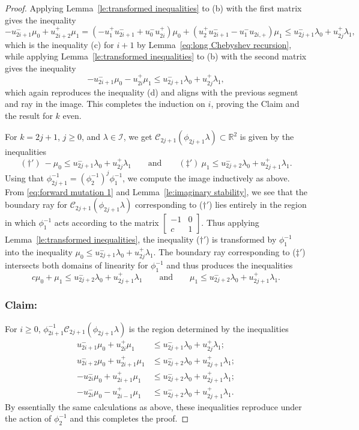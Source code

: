 \documentclass[pdflatex,sn-mathphys]{sn-jnl}%
\theoremstyle{thmstyleone}%
\theoremstyle{thmstyletwo}%
\theoremstyle{thmstylethree}%
\newcommand{\cC}{\mathcal{C}}
\newcommand{\cI}{\mathcal{I}}
\newcommand{\RR}{\mathbb{R}}
\begin{document}
\begin{proof}
    Applying Lemma~\ref{le:transformed inequalities} to (b) with the first matrix gives the inequality 
    \[-u_{2i+1}^-\mu_0+u_{2i+2}^+\mu_1=(-u_1^+u_{2i+1}^-+u_0^-u_{2i}^+)\mu_0+(u_2^+u_{2i+1}^--u_1^-u_{2i,+})\mu_1\le u_{2j+1}^-\lambda_0+u_{2j}^+\lambda_1,\]
    which is the inequality (c) for $i+1$ by Lemma~\ref{eq:long Chebyshev recursion}, while applying Lemma~\ref{le:transformed inequalities} to (b) with the second matrix gives the inequality 
    \[-u_{2i+1}^-\mu_0-u_{2i}^+\mu_1\le u_{2j+1}^-\lambda_0+u_{2j}^+\lambda_1,\]
    which again reproduces the inequality (d) and aligns with the previous segment and ray in the image.
    This completes the induction on $i$, proving the Claim and the result for $k$ even.

    For $k=2j+1$, $j\ge0$, and $\lambda\in\cI$, we get $\cC_{2j+1}(\phi_{2j+1}\lambda)\subset\RR^2$ is given by the inequalities 
    \[ (\dagger')\ -\mu_0\le u_{2j+1}^-\lambda_0+u_{2j}^+\lambda_1 \qquad\text{and}\qquad (\ddagger')\ \mu_1\le u_{2j+2}^-\lambda_0+u_{2j+1}^+\lambda_1.\]
    Using that $\phi_{2j+1}^{-1}=\left(\phi_2^{-1}\right)^j\phi_1^{-1}$, we compute the image inductively as above.
    From \eqref{eq:forward mutation 1} and Lemma~\ref{le:imaginary stability}, we see that the boundary ray for $\cC_{2j+1}(\phi_{2j+1}\lambda)$ corresponding to ($\dagger'$) lies entirely in the region in which $\phi_1^{-1}$ acts according to the matrix $\left[ \begin{array}{cc} -1 & 0\\ c & 1 \end{array}\right]$.
    Thus applying Lemma~\ref{le:transformed inequalities}, the inequality ($\dagger'$) is transformed by $\phi_1^{-1}$ into the inequality $\mu_0\le u_{2j+1}^-\lambda_0+u_{2j}^+\lambda_1$.
    The boundary ray corresponding to ($\ddagger'$) intersects both domains of linearity for $\phi_1^{-1}$ and thus produces the inequalities
    \[ c\mu_0+\mu_1\le u_{2j+2}^-\lambda_0+u_{2j+1}^+\lambda_1 \qquad\text{and}\qquad \mu_1\le u_{2j+2}^-\lambda_0+u_{2j+1}^+\lambda_1.\]

    \subsubsection*{Claim:} For $i\ge 0$, $\phi_{2i+1}^{-1}\cC_{2j+1}(\phi_{2j+1}\lambda)$ is the region determined by the inequalities 
    \begin{align*}
      \tag{a$'$} u_{2i+1}^-\mu_0+u_{2i}^+\mu_1 &\le u_{2j+1}^-\lambda_0+u_{2j}^+\lambda_1;\\
      \tag{b$'$} u_{2i+2}^-\mu_0+u_{2i+1}^+\mu_1 &\le u_{2j+2}^-\lambda_0+u_{2j+1}^+\lambda_1;\\
      \tag{c$'$} -u_{2i}^-\mu_0+u_{2i+1}^+\mu_1 &\le u_{2j+2}^-\lambda_0+u_{2j+1}^+\lambda_1;\\
      \tag{d$'$} -u_{2i}^-\mu_0-u_{2i-1}^+\mu_1 &\le u_{2j+2}^-\lambda_0+u_{2j+1}^+\lambda_1.
    \end{align*}
    By essentially the same calculations as above, these inequalities reproduce under the action of $\phi_2^{-1}$ and this completes the proof.
  \end{proof}
\end{document}
